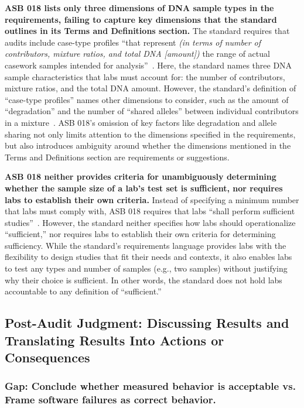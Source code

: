 \textbf{ASB 018 lists only three dimensions of DNA sample types in the requirements, failing to capture key dimensions that the standard outlines in its Terms and Definitions section.} The standard requires that audits include case-type profiles ``that represent \textit{(in terms of number of contributors, mixture ratios, and total DNA [amount])} the range of actual casework samples intended for analysis''~\cite[R4.1.3, emph. added]{asb018}. Here, the standard names three DNA sample characteristics that labs must account for: the number of contributors, mixture ratios, and the total DNA amount. However, the standard's definition of ``case-type profiles'' names other dimensions to consider, such as the amount of ``degradation'' and the number of ``shared alleles'' between individual contributors in a mixture~\cite[p.1]{asb018}. ASB 018's omission of key factors like degradation and allele sharing not only limits attention to the dimensions specified in the requirements, but also introduces ambiguity around whether the dimensions mentioned in the Terms and Definitions section are requirements or suggestions. 
 

\textbf{ASB 018 neither provides criteria for unambiguously determining whether the sample size of a lab's test set is sufficient, nor requires labs to establish their own criteria.} Instead of specifying a minimum number that labs must comply with, ASB 018 requires that labs ``shall perform sufficient studies''~\cite[Annex A, R4.1.3]{asb018}. However, the standard neither specifies how labs should operationalize ``sufficient,'' nor requires labs to establish their own criteria for determining sufficiency. While the standard's requirements language provides labs with the flexibility to design studies that fit their needs and contexts, it also enables labs to test any types and number of samples (e.g., two samples) without justifying why their choice is sufficient. In other words, the standard does not hold labs accountable to any definition of ``sufficient.''


\subsection{Post-Audit Judgment: Discussing Results and Translating Results Into Actions or Consequences}
\label{sec:judgement}

\subsubsection{Gap: Conclude whether measured behavior is acceptable vs. Frame software failures as correct behavior.} 
\label{sec:judgement-gap1}

